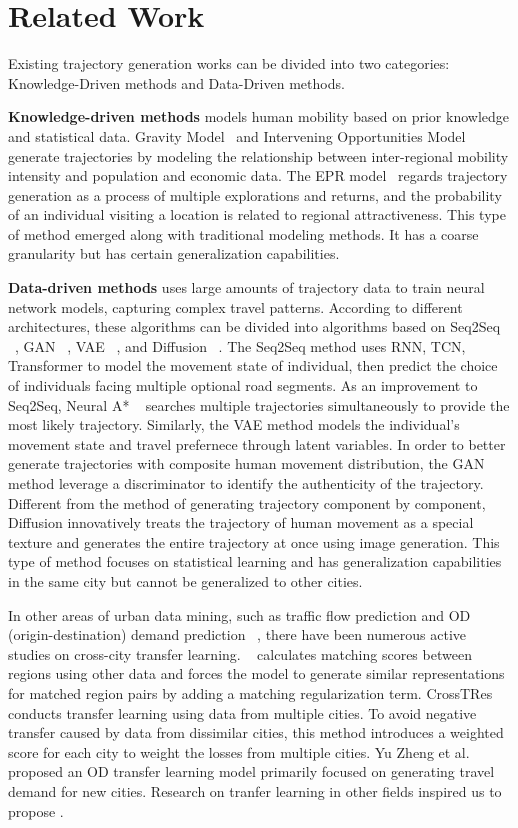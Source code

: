 \section{Related Work}
Existing trajectory generation works can be divided into two categories: Knowledge-Driven methods and Data-Driven methods.

\textbf{Knowledge-driven methods} models human mobility based on prior knowledge and statistical data. Gravity Model~\cite{gravity_1946} and Intervening Opportunities Model~\cite{interventing} generate trajectories by modeling the relationship between inter-regional mobility intensity and population and economic data. The EPR model~\cite{epr_1, epr_2} regards trajectory generation as a process of multiple explorations and returns, and the probability of an individual visiting a location is related to regional attractiveness. This type of method emerged along with traditional modeling methods. It has a coarse granularity but has certain generalization capabilities.

\textbf{Data-driven methods} uses large amounts of trajectory data to train neural network models,  capturing complex travel patterns. According to different architectures, these algorithms can be divided into algorithms based on Seq2Seq ~\cite{Seq2Seq}, GAN ~\cite{SeqGAN}, VAE ~\cite{volunteer, SVAE}, and Diffusion ~\cite{difftraj}. The Seq2Seq method uses RNN, TCN, Transformer to model the movement state of individual, then predict the choice of individuals facing multiple optional road segments. As an improvement to Seq2Seq, Neural A* ~\cite{ts_trajgen} searches multiple trajectories simultaneously to provide the most likely trajectory.  Similarly, the VAE method models the individual's movement state and travel prefernece through latent variables. In order to better generate trajectories with composite human movement distribution, the GAN method leverage a discriminator to identify the authenticity of the trajectory. Different from the method of generating trajectory component by component, Diffusion innovatively treats the trajectory of human movement as a special texture and generates the entire trajectory at once using image generation. This type of method focuses on statistical learning and has generalization capabilities in the same city but cannot be generalized to other cities.

In other areas of urban data mining, such as traffic flow prediction  and OD (origin-destination) demand prediction ~\cite{predji2023spatio, predjiang2023pdformer, predwang2022traffic}, there have been numerous active studies on cross-city transfer learning. ~\cite{wang2018cross} calculates matching scores between regions using other data and forces the model to generate similar representations for matched region pairs by adding a matching regularization term. 
CrossTRes~\cite{jin2022selective} conducts transfer learning using data from multiple cities. To avoid negative transfer caused by data from dissimilar cities, this method introduces a weighted score for each city to weight the losses from multiple cities. Yu Zheng et al.~\cite{he2020human} proposed an OD transfer learning model primarily focused on generating travel demand for new cities. Research on tranfer learning in other fields inspired us to propose \name.